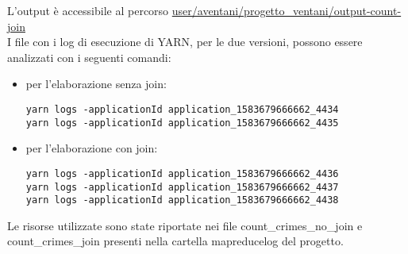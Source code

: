 \documentclass[10pt]{article}
\begin{document}
L'output è accessibile al percorso \url{user/aventani/progetto_ventani/output-count-join} \\

I file con i log di esecuzione di YARN, per le due versioni, possono essere analizzati con i seguenti comandi:
\begin{itemize}
\item per l'elaborazione senza join: 
\begin{lstlisting}
yarn logs -applicationId application_1583679666662_4434
yarn logs -applicationId application_1583679666662_4435
\end{lstlisting}
\item per l'elaborazione con join:
\begin{lstlisting}
yarn logs -applicationId application_1583679666662_4436
yarn logs -applicationId application_1583679666662_4437
yarn logs -applicationId application_1583679666662_4438
\end{lstlisting}
\end{itemize}
Le risorse utilizzate sono state riportate nei file count\_crimes\_no\_join e count\_crimes\_join presenti nella cartella \/mapreduce\/log del progetto.
\end{document}
